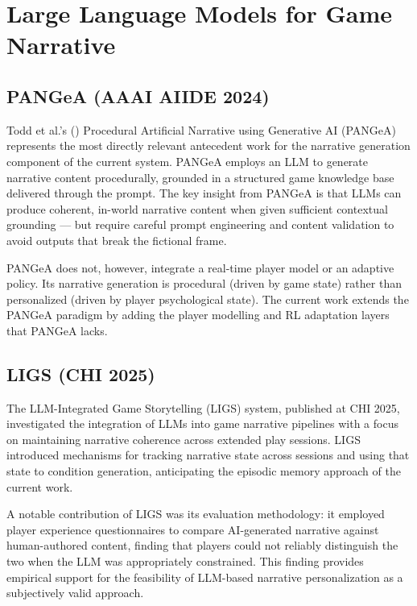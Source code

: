 \documentclass[12pt,a4paper]{report}
\begin{document}
\section{Large Language Models for Game Narrative}

\subsection{PANGeA (AAAI AIIDE 2024)}

Todd et al.'s (\citeyear{todd2024pangea}) Procedural Artificial Narrative using Generative AI (PANGeA) represents the most directly relevant antecedent work for the narrative generation component of the current system. PANGeA employs an LLM to generate narrative content procedurally, grounded in a structured game knowledge base delivered through the prompt. The key insight from PANGeA is that LLMs can produce coherent, in-world narrative content when given sufficient contextual grounding --- but require careful prompt engineering and content validation to avoid outputs that break the fictional frame.

PANGeA does not, however, integrate a real-time player model or an adaptive policy. Its narrative generation is procedural (driven by game state) rather than personalized (driven by player psychological state). The current work extends the PANGeA paradigm by adding the player modelling and RL adaptation layers that PANGeA lacks.

\subsection{LIGS (CHI 2025)}

The LLM-Integrated Game Storytelling (LIGS) system, published at CHI 2025, investigated the integration of LLMs into game narrative pipelines with a focus on maintaining narrative coherence across extended play sessions. LIGS introduced mechanisms for tracking narrative state across sessions and using that state to condition generation, anticipating the episodic memory approach of the current work.

A notable contribution of LIGS was its evaluation methodology: it employed player experience questionnaires to compare AI-generated narrative against human-authored content, finding that players could not reliably distinguish the two when the LLM was appropriately constrained. This finding provides empirical support for the feasibility of LLM-based narrative personalization as a subjectively valid approach.
\end{document}
